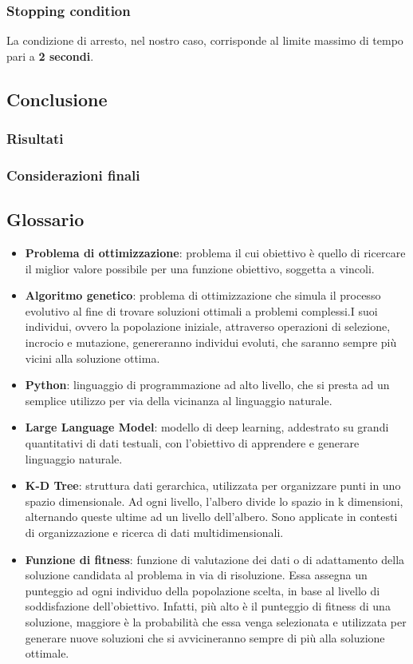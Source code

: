 \documentclass{CSUniSchoolLabReport}
\begin{document}
\subsubsection{Stopping condition}

La condizione di arresto, nel nostro caso, corrisponde al limite massimo di tempo pari a \textbf{2 secondi}.

\subsection{Conclusione}
\subsubsection{Risultati}
\subsubsection{Considerazioni finali}

\subsection{Glossario}

\begin{itemize}
   \item \textbf{Problema di ottimizzazione}: problema il cui obiettivo è quello di ricercare il miglior valore possibile per una funzione obiettivo, soggetta a vincoli.
   \item \textbf{Algoritmo genetico}: problema di ottimizzazione che simula il processo evolutivo al fine di trovare soluzioni ottimali a problemi complessi.I suoi individui, ovvero la popolazione iniziale, attraverso operazioni di selezione, incrocio e mutazione, genereranno individui evoluti, che saranno sempre più vicini alla soluzione ottima.
   \item \textbf{Python}: linguaggio di programmazione ad alto livello, che si presta ad un semplice utilizzo per via della vicinanza al linguaggio naturale.
   \item \textbf{Large Language Model}: modello di deep learning, addestrato su grandi quantitativi di dati testuali, con l'obiettivo di apprendere e generare linguaggio naturale.
   \item \textbf{K-D Tree}: struttura dati gerarchica, utilizzata per organizzare punti in uno spazio dimensionale. Ad ogni livello, l'albero divide lo spazio in k dimensioni, alternando queste ultime ad un livello dell'albero. Sono applicate in contesti di organizzazione e ricerca di dati multidimensionali.
   \item \textbf{Funzione di fitness}: funzione di valutazione dei dati o di adattamento della soluzione candidata al problema in via di risoluzione. Essa assegna un punteggio ad ogni individuo della popolazione scelta, in base al livello di soddisfazione dell'obiettivo. Infatti, più alto è il punteggio di fitness di una soluzione, maggiore è la probabilità che essa venga selezionata e utilizzata per generare nuove soluzioni che si avvicineranno sempre di più alla soluzione ottimale.
\end{itemize}
\end{document}
